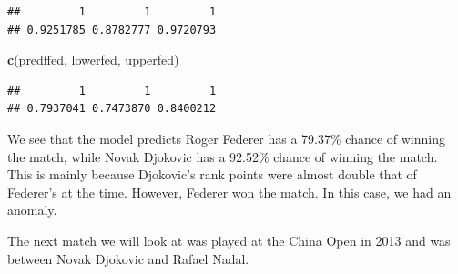 \documentclass[]{article}
\newenvironment{Shaded}{\begin{snugshade}}{\end{snugshade}}
\newcommand{\KeywordTok}[1]{\textcolor[rgb]{0.13,0.29,0.53}{\textbf{#1}}}
\newcommand{\NormalTok}[1]{#1}
\newcommand{\OperatorTok}[1]{\textcolor[rgb]{0.81,0.36,0.00}{\textbf{#1}}}
\newcommand{\StringTok}[1]{\textcolor[rgb]{0.31,0.60,0.02}{#1}}
\begin{document}
\begin{verbatim}
##         1         1         1 
## 0.9251785 0.8782777 0.9720793
\end{verbatim}

\begin{Shaded}
\begin{Highlighting}[]
\KeywordTok{c}\NormalTok{(predffed, lowerfed, upperfed)}
\end{Highlighting}
\end{Shaded}

\begin{verbatim}
##         1         1         1 
## 0.7937041 0.7473870 0.8400212
\end{verbatim}

We see that the model predicts Roger Federer has a 79.37\% chance of
winning the match, while Novak Djokovic has a 92.52\% chance of winning
the match. This is mainly because Djokovic's rank points were almost
double that of Federer's at the time. However, Federer won the match. In
this case, we had an anomaly.

The next match we will look at was played at the China Open in 2013 and
was between Novak Djokovic and Rafael Nadal.

\begin{Shaded}
\end{Shaded}
\end{document}

